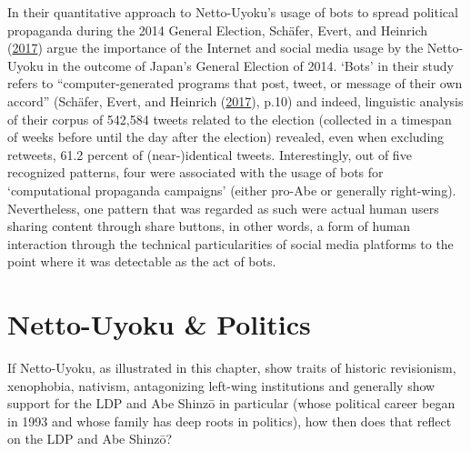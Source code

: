 \documentclass[10pt,british,A4paper,,openany]{memoir}
\begin{document}
In their quantitative approach to Netto-Uyoku's usage of bots to spread
political propaganda during the 2014 General Election, Schäfer, Evert,
and Heinrich (\protect\hyperlink{ref-schafer_japans_2017}{2017}) argue
the importance of the Internet and social media usage by the Netto-Uyoku
in the outcome of Japan's General Election of 2014. `Bots' in their
study refers to ``computer-generated programs that post, tweet, or
message of their own accord'' (Schäfer, Evert, and Heinrich
(\protect\hyperlink{ref-schafer_japans_2017}{2017}), p.10) and indeed,
linguistic analysis of their corpus of 542,584 tweets related to the
election (collected in a timespan of weeks before until the day after
the election) revealed, even when excluding retweets, 61.2 percent of
(near-)identical tweets. Interestingly, out of five recognized patterns,
four were associated with the usage of bots for `computational
propaganda campaigns' (either pro-Abe or generally right-wing).
Nevertheless, one pattern that was regarded as such were actual human
users sharing content through share buttons, in other words, a form of
human interaction through the technical particularities of social media
platforms to the point where it was detectable as the act of bots.

\section{Netto-Uyoku \& Politics}\label{netto-uyoku-politics}

If Netto-Uyoku, as illustrated in this chapter, show traits of historic
revisionism, xenophobia, nativism, antagonizing left-wing institutions
and generally show support for the LDP and Abe Shinzō in particular
(whose political career began in 1993 and whose family has deep roots in
politics), how then does that reflect on the LDP and Abe Shinzō?
\end{document}
